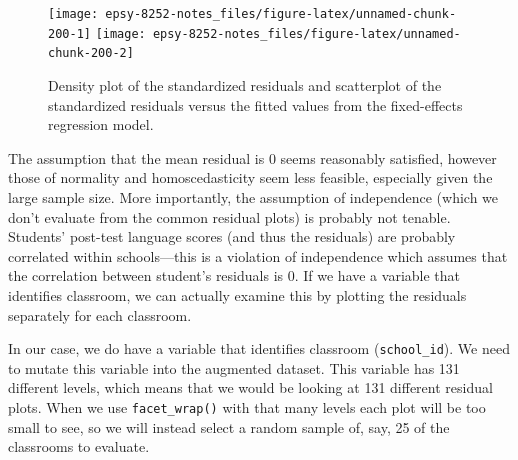 \documentclass[]{book}
\begin{document}
\begin{figure}

{\centering \texttt{[image: epsy-8252-notes\_files/figure-latex/unnamed-chunk-200-1]} \texttt{[image: epsy-8252-notes\_files/figure-latex/unnamed-chunk-200-2]} 

}

\caption{Density plot of the standardized residuals and scatterplot of the standardized residuals versus the fitted values from the fixed-effects regression model.}\label{fig:unnamed-chunk-200}
\end{figure}

The assumption that the mean residual is 0 seems reasonably satisfied, however those of normality and homoscedasticity seem less feasible, especially given the large sample size. More importantly, the assumption of independence (which we don't evaluate from the common residual plots) is probably not tenable. Students' post-test language scores (and thus the residuals) are probably correlated within schools---this is a violation of independence which assumes that the correlation between student's residuals is 0. If we have a variable that identifies classroom, we can actually examine this by plotting the residuals separately for each classroom.

In our case, we do have a variable that identifies classroom (\texttt{school\_id}). We need to mutate this variable into the augmented dataset. This variable has 131 different levels, which means that we would be looking at 131 different residual plots. When we use \texttt{facet\_wrap()} with that many levels each plot will be too small to see, so we will instead select a random sample of, say, 25 of the classrooms to evaluate.
\end{document}
